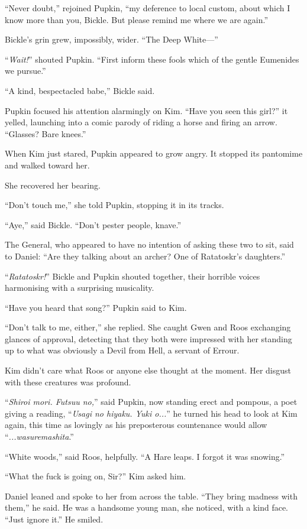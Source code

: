 \documentclass[11pt,a5paper]{article}
\begin{document}
``Never doubt,'' rejoined Pupkin, ``my deference to local custom, about which I know more than you, Bickle. But please remind me where we are again.''

Bickle's grin grew, impossibly, wider. ``The Deep White---''

``\emph{Wait!}'' shouted Pupkin. ``First inform these fools which of the gentle Eumenides we pursue.''

``A kind, bespectacled babe,'' Bickle said.

Pupkin focused his attention alarmingly on Kim. ``Have you seen this girl?'' it yelled, launching into a comic parody of riding a horse and firing an arrow. ``Glasses? Bare knees.''

When Kim just stared, Pupkin appeared to grow angry. It stopped its pantomime and walked toward her.

She recovered her bearing.

``Don't touch me,'' she told Pupkin, stopping it in its tracks.

``Aye,'' said Bickle. ``Don't pester people, knave.''

The General, who appeared to have no intention of asking these two to sit, said to Daniel: ``Are they talking about an archer? One of Ratatoskr's daughters.''

``\emph{Ratatoskr!}'' Bickle and Pupkin shouted together, their horrible voices harmonising with a surprising musicality.

``Have you heard that song?'' Pupkin said to Kim.

``Don't talk to me, either,'' she replied. She caught Gwen and Roos exchanging glances of approval, detecting that they both were impressed with her standing up to what was obviously a Devil from Hell, a servant of Errour.

Kim didn't care what Roos or anyone else thought at the moment. Her disgust with these creatures was profound.

``\emph{Shiroi mori. Futsuu no,}'' said Pupkin, now standing erect and pompous, a poet giving a reading, ``\emph{Usagi no hiyaku. Yuki o...}'' he turned his head to look at Kim again, this time as lovingly as his preposterous countenance would allow ``\emph{...wasuremashita}.''

``White woods,'' said Roos, helpfully. ``A Hare leaps. I forgot it was snowing.''

``What the fuck is going on, Sir?'' Kim asked him.

Daniel leaned and spoke to her from across the table. ``They bring madness with them,'' he said. He was a handsome young man, she noticed, with a kind face. ``Just ignore it.'' He smiled.
\end{document}
